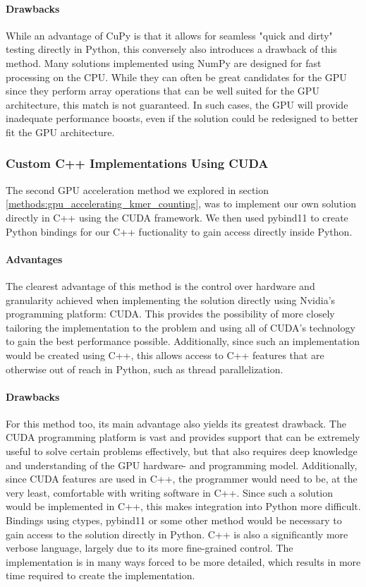 \paragraph{Drawbacks}
While an advantage of CuPy is that it allows for seamless "quick and dirty" testing directly in Python, this conversely also introduces a drawback of this method.
Many solutions implemented using NumPy are designed for fast processing on the CPU.
While they can often be great candidates for the GPU since they perform array operations that can be well suited for the GPU architecture, this match is not guaranteed. 
In such cases, the GPU will provide inadequate performance boosts, even if the solution could be redesigned to better fit the GPU architecture.

\subsubsection{Custom C++ Implementations Using CUDA}
The second GPU acceleration method we explored in section \ref{methods:gpu_accelerating_kmer_counting}, was to implement our own solution directly in C++ using the CUDA framework.
We then used pybind11 to create Python bindings for our C++ fuctionality to gain access directly inside Python.

\paragraph{Advantages}
The clearest advantage of this method is the control over hardware and granularity achieved when implementing the solution directly using Nvidia's programming platform: CUDA.
This provides the possibility of more closely tailoring the implementation to the problem and using all of CUDA's technology to gain the best performance possible.
Additionally, since such an implementation would be created using C++, this allows access to C++ features that are otherwise out of reach in Python, such as thread parallelization.

\paragraph{Drawbacks}
For this method too, its main advantage also yields its greatest drawback.
The CUDA programming platform is vast and provides support that can be extremely useful to solve certain problems effectively, but that also requires deep knowledge and understanding of the GPU hardware- and programming model.
Additionally, since CUDA features are used in C++, the programmer would need to be, at the very least, comfortable with writing software in C++.
Since such a solution would be implemented in C++, this makes integration into Python more difficult.
Bindings using ctypes, pybind11 or some other method would be necessary to gain access to the solution directly in Python.
C++ is also a significantly more verbose language, largely due to its more fine-grained control.
The implementation is in many ways forced to be more detailed, which results in more time required to create the implementation.

